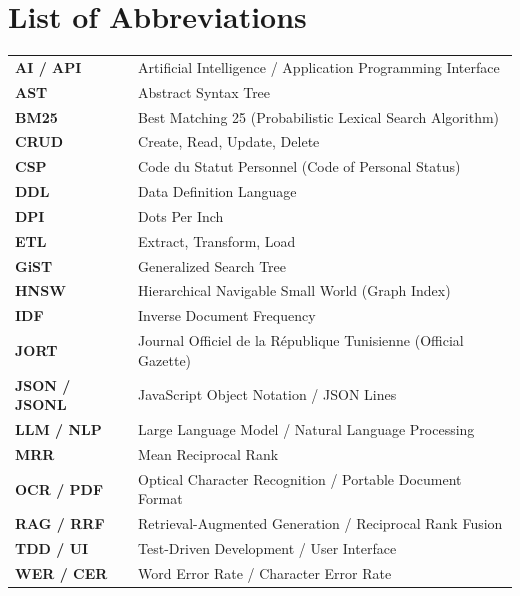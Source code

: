 \documentclass[12pt,a4paper]{report}
\begin{document}
\chapter*{List of Abbreviations}
\begin{table}[H]
\small
\begin{tabularx}{\textwidth}{lX}
\textbf{AI / API} & Artificial Intelligence / Application Programming Interface \\
\textbf{AST} & Abstract Syntax Tree \\
\textbf{BM25} & Best Matching 25 (Probabilistic Lexical Search Algorithm) \\
\textbf{CRUD} & Create, Read, Update, Delete \\
\textbf{CSP} & Code du Statut Personnel (Code of Personal Status) \\
\textbf{DDL} & Data Definition Language \\
\textbf{DPI} & Dots Per Inch \\
\textbf{ETL} & Extract, Transform, Load \\
\textbf{GiST} & Generalized Search Tree \\
\textbf{HNSW} & Hierarchical Navigable Small World (Graph Index) \\
\textbf{IDF} & Inverse Document Frequency \\
\textbf{JORT} & Journal Officiel de la R\'epublique Tunisienne (Official Gazette) \\
\textbf{JSON / JSONL} & JavaScript Object Notation / JSON Lines \\
\textbf{LLM / NLP} & Large Language Model / Natural Language Processing \\
\textbf{MRR} & Mean Reciprocal Rank \\
\textbf{OCR / PDF} & Optical Character Recognition / Portable Document Format \\
\textbf{RAG / RRF} & Retrieval-Augmented Generation / Reciprocal Rank Fusion \\
\textbf{TDD / UI} & Test-Driven Development / User Interface \\
\textbf{WER / CER} & Word Error Rate / Character Error Rate \\
\end{tabularx}
\end{table}

\tableofcontents
\listoffigures
\listoftables

\clearpage
{}

\end{document}
